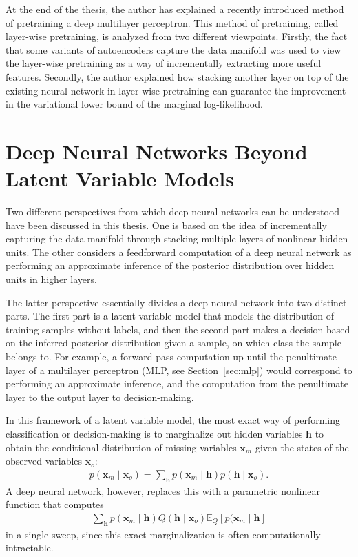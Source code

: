 \documentclass[dissertation,nocontribution]{aaltoseries}
\newcommand{\vect}[1]{\mathbf{#1}}
\newcommand{\vh}[0]{\vect{h}}
\newcommand{\vx}[0]{\vect{x}}
\newcommand{\E}[0]{\mathbb{E}}
\begin{document}
At the end of the thesis, the author has explained a recently
introduced method of pretraining a deep multilayer
perceptron. This method of pretraining, called layer-wise
pretraining, is analyzed from two different viewpoints.
Firstly, the fact that some variants of autoencoders capture
the data manifold was used to view the layer-wise
pretraining as a way of incrementally extracting more useful
features. Secondly, the author explained how stacking
another layer on top of the existing neural network in 
layer-wise pretraining can guarantee the improvement in the
variational lower bound of the marginal log-likelihood.


\section{Deep Neural Networks Beyond Latent Variable Models}

Two different perspectives from which deep neural networks
can be understood have been discussed in this thesis. One is
based on the idea of incrementally capturing the data manifold
through stacking multiple layers of nonlinear hidden units.
The other considers a feedforward computation of a deep
neural network as performing an approximate inference of the
posterior distribution over hidden units in higher layers.

The latter perspective essentially divides a deep neural
network into two distinct parts. The first part is a latent
variable model that models the distribution of training
samples without labels, and then the second part makes a
decision based on the inferred posterior distribution given
a sample, on which class the sample belongs to. For example,
a forward pass computation up until the penultimate layer of
a multilayer perceptron (MLP, see Section~\ref{sec:mlp})
would correspond to performing an approximate inference, and the
computation from the penultimate layer to the output layer
to decision-making.

In this framework of a latent variable model, the most exact
way of performing classification or decision-making is
to marginalize out hidden variables $\vh$ to obtain the
conditional distribution of missing variables $\vx_m$ given
the states of the observed variables $\vx_o$:
\begin{align*}
    p(\vx_m \mid \vx_o) = \sum_{\vh} p(\vx_m \mid \vh) p(\vh
    \mid \vx_o).
\end{align*}
A deep neural network, however, replaces
this with a parametric nonlinear function that computes
\begin{align*}
    \sum_{\vh} p(\vx_m \mid
    \vh) Q(\vh \mid \vx_o) 
    \E_Q\left[p(\vx_m \mid
    \vh \right]
\end{align*}
in a single sweep, since this exact marginalization is often
computationally intractable.
\end{document}
